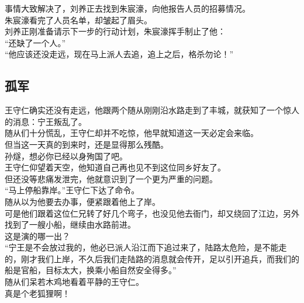 \begin{multicols}{\theparacolNo}
事情大致解决了，刘养正去找到朱宸濠，向他报告人员的招募情况。\\

朱宸濠看完了人员名单，却皱起了眉头。\\

刘养正刚准备请示下一步的行动计划，朱宸濠挥手制止了他：\\

“还缺了一个人。”\\

“他应该还没走远，现在马上派人去追，追上之后，格杀勿论！”\\

\subsection{孤军}
王守仁确实还没有走远，他跟两个随从刚刚沿水路走到了丰城，就获知了一个惊人的消息：宁王叛乱了。\\

随从们十分慌乱，王守仁却并不吃惊，他早就知道这一天必定会来临。\\

但当这一天真的到来时，还是显得那么残酷。\\

孙燧，想必你已经以身殉国了吧。\\

王守仁仰望着天空，他知道自己再也见不到这位同乡好友了。\\

但还没等悲痛发泄完，他就意识到了一个更为严重的问题。\\

“马上停船靠岸。”王守仁下达了命令。\\

随从以为他要去办事，便紧跟着他上了岸。\\

可是他们跟着这位仁兄转了好几个弯子，也没见他去衙门，却又绕回了江边，另外找到了一艘小船，继续由水路前进。\\

这是演的哪一出？\\

“宁王是不会放过我的，他必已派人沿江而下追过来了，陆路太危险，是不能走的，刚才我们上岸，不久后我们走陆路的消息就会传开，足以引开追兵，而我们的船是官船，目标太大，换乘小船自然安全得多。”\\

随从们呆若木鸡地看着平静的王守仁。\\

真是个老狐狸啊！\\


\end{multicols}

